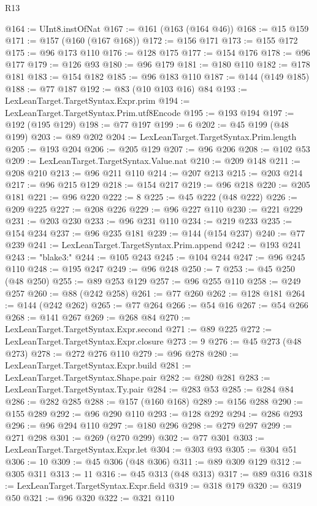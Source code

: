 \begin{lexlean}{R13}
\begin{coremodule}
@164 := UInt8.instOfNat
@167 := @161 (@163 (@164 @46))
@168 := @15 @159
@171 := @157 (@160 (@167 @168))
@172 := @156 @171
@173 := @155 @172
@175 := @96 @173 @110
@176 := @128 @175
@177 := @154 @176
@178 := @96 @177
@179 := @126 @93
@180 := @96 @179
@181 := @180 @110
@182 := @178 @181
@183 := @154 @182
@185 := @96 @183 @110
@187 := @144 (@149 @185)
@188 := @77 @187
@192 := @83 (@10 @103 @16) @84
@193 := LexLeanTarget.TargetSyntax.Expr.prim
@194 := LexLeanTarget.TargetSyntax.Prim.utf8Encode
@195 := @193 @194
@197 := @192 (@195 @129)
@198 := @77 @197
@199 := 6
@202 := @45 @199 (@48 @199)
@203 := @89 @202
@204 := LexLeanTarget.TargetSyntax.Prim.length
@205 := @193 @204
@206 := @205 @129
@207 := @96 @206
@208 := @102 @53
@209 := LexLeanTarget.TargetSyntax.Value.nat
@210 := @209 @148
@211 := @208 @210
@213 := @96 @211 @110
@214 := @207 @213
@215 := @203 @214
@217 := @96 @215 @129
@218 := @154 @217
@219 := @96 @218
@220 := @205 @181
@221 := @96 @220
@222 := 8
@225 := @45 @222 (@48 @222)
@226 := @209 @225
@227 := @208 @226
@229 := @96 @227 @110
@230 := @221 @229
@231 := @203 @230
@233 := @96 @231 @110
@234 := @219 @233
@235 := @154 @234
@237 := @96 @235 @181
@239 := @144 (@154 @237)
@240 := @77 @239
@241 := LexLeanTarget.TargetSyntax.Prim.append
@242 := @193 @241
@243 := "blake3:"
@244 := @105 @243
@245 := @104 @244
@247 := @96 @245 @110
@248 := @195 @247
@249 := @96 @248
@250 := 7
@253 := @45 @250 (@48 @250)
@255 := @89 @253 @129
@257 := @96 @255 @110
@258 := @249 @257
@260 := @88 (@242 @258)
@261 := @77 @260
@262 := @128 @181
@264 := @144 (@242 @262)
@265 := @77 @264
@266 := @54 @16
@267 := @54 @266
@268 := @141 @267
@269 := @268 @84
@270 := LexLeanTarget.TargetSyntax.Expr.second
@271 := @89 @225
@272 := LexLeanTarget.TargetSyntax.Expr.closure
@273 := 9
@276 := @45 @273 (@48 @273)
@278 := @272 @276 @110
@279 := @96 @278
@280 := LexLeanTarget.TargetSyntax.Expr.build
@281 := LexLeanTarget.TargetSyntax.Shape.pair
@282 := @280 @281
@283 := LexLeanTarget.TargetSyntax.Ty.pair
@284 := @283 @53
@285 := @284 @84
@286 := @282 @285
@288 := @157 (@160 @168)
@289 := @156 @288
@290 := @155 @289
@292 := @96 @290 @110
@293 := @128 @292
@294 := @286 @293
@296 := @96 @294 @110
@297 := @180 @296
@298 := @279 @297
@299 := @271 @298
@301 := @269 (@270 @299)
@302 := @77 @301
@303 := LexLeanTarget.TargetSyntax.Expr.let
@304 := @303 @93
@305 := @304 @51
@306 := 10
@309 := @45 @306 (@48 @306)
@311 := @89 @309 @129
@312 := @305 @311
@313 := 11
@316 := @45 @313 (@48 @313)
@317 := @89 @316
@318 := LexLeanTarget.TargetSyntax.Expr.field
@319 := @318 @179
@320 := @319 @50
@321 := @96 @320
@322 := @321 @110

\end{coremodule}
\end{lexlean}
